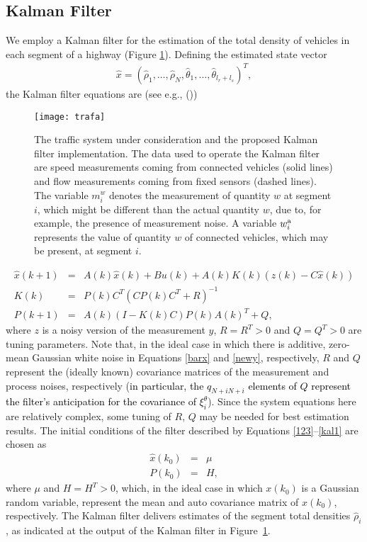 \documentclass[titlepage,oneside,fleqn,12pt]{article}
\newcommand{\trbnum}[1]{{\it \citenum{#1}}}
\begin{document}
\subsection{Kalman Filter} \label{sec:kal2}
We employ a Kalman filter for the estimation of the total density of vehicles in each segment of a highway (Figure \ref{fig1}). Defining the estimated state vector
\begin{eqnarray}
\hat{{x}}=\left(\hat{\rho}_1,\ldots,\hat{\rho}_N,\hat{\theta}_1,\ldots,\hat{\theta}_{l_r+l_s}\right)^T,
\end{eqnarray}
the Kalman filter equations are (see e.g., (\trbnum{Anderson1979}))

\begin{figure}
\begin{center}
	\texttt{[image: trafa]}
	\caption{The traffic system under consideration and the proposed Kalman filter implementation. The data used to operate the Kalman filter are speed measurements coming from connected vehicles (solid lines) and flow measurements coming from fixed sensors (dashed lines). The variable $m_i^w$ denotes the measurement of quantity $w$ at segment $i$, which might be different than the actual quantity $w$, due to, for example, the presence of measurement noise. A variable $w_i^{\rm a}$ represents the value of quantity $w$ of connected vehicles, which may be present, at segment $i$.}
	\label{fig1}
\end{center}
\end{figure}

\begin{eqnarray}
\hat{{x}}(k+1)&=&{A}(k)\hat{{x}}(k)+{B}{u}(k)+{{A}}(k){K}(k)\left({{z}}(k)-{C}\hat{{x}}(k)\right)\label{123}\\
{K}(k)&=&{P}(k){C}^T\left({C}{P}(k){C}^T+{R}\right)^{-1}\\
{P}(k+1)&=&{A}(k)\left(I-{K}(k){C}\right){P}(k){A}(k)^T+{Q},\label{kal1}
\end{eqnarray}
where ${z}$ is a noisy version of the measurement ${y}$, ${R}=R^T>0$ and ${Q}={Q}^T>0$ are tuning parameters. Note that, in the ideal case in which there is additive, zero-mean Gaussian white noise in Equations \ref{barx} and \ref{newy}, respectively, $R$ and $Q$ represent the (ideally known) covariance matrices of the measurement and process noises, respectively (\textcolor{black}{in particular, the ${q}_{N+iN+i}$ elements of ${Q}$ represent the filter's anticipation for the covariance of $\xi_i^{\theta}$}). Since the system equations here are relatively complex, some tuning of $R$, $Q$ may be needed for best estimation results.
The initial conditions of the filter described by Equations \ref{123}--\ref{kal1} are chosen as
\begin{eqnarray}
\hat{{x}}(k_0)&=&\mu\\
{P}(k_0)&=&H,\label{1234}
\end{eqnarray}
where $\mu$ and $H=H^T>0$, which, in the ideal case in which ${x}(k_0)$ is a Gaussian random variable, represent the mean and auto covariance matrix of ${x}(k_0)$, respectively. The Kalman filter delivers estimates of the segment total densities $\hat{\rho}_i$, as indicated at the output of the Kalman filter in Figure~\ref{fig1}.
\end{document}
